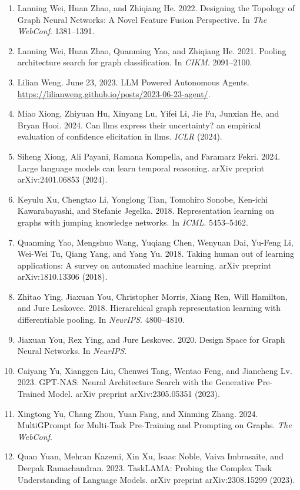 \documentclass[11pt,UTF8,fontset=fandol]{ctexart}
\begin{document}
\begin{enumerate}[leftmargin=2em,labelsep=0.5em]
\item Lanning Wei, Huan Zhao, and Zhiqiang He. 2022. Designing the Topology of Graph Neural Networks: A Novel Feature Fusion Perspective. In \textit{The WebConf}. 1381--1391.
\item Lanning Wei, Huan Zhao, Quanming Yao, and Zhiqiang He. 2021. Pooling architecture search for graph classification. In \textit{CIKM}. 2091--2100.
\item Lilian Weng. June 23, 2023. LLM Powered Autonomous Agents. \url{https://lilianweng.github.io/posts/2023-06-23-agent/}.
\item Miao Xiong, Zhiyuan Hu, Xinyang Lu, Yifei Li, Jie Fu, Junxian He, and Bryan Hooi. 2024. Can llms express their uncertainty? an empirical evaluation of confidence elicitation in llms. \textit{ICLR} (2024).
\item Siheng Xiong, Ali Payani, Ramana Kompella, and Faramarz Fekri. 2024. Large language models can learn temporal reasoning. arXiv preprint arXiv:2401.06853 (2024).
\item Keyulu Xu, Chengtao Li, Yonglong Tian, Tomohiro Sonobe, Ken-ichi Kawarabayashi, and Stefanie Jegelka. 2018. Representation learning on graphs with jumping knowledge networks. In \textit{ICML}. 5453--5462.
\item Quanming Yao, Mengshuo Wang, Yuqiang Chen, Wenyuan Dai, Yu-Feng Li, Wei-Wei Tu, Qiang Yang, and Yang Yu. 2018. Taking human out of learning applications: A survey on automated machine learning. arXiv preprint arXiv:1810.13306 (2018).
\item Zhitao Ying, Jiaxuan You, Christopher Morris, Xiang Ren, Will Hamilton, and Jure Leskovec. 2018. Hierarchical graph representation learning with differentiable pooling. In \textit{NeurIPS}. 4800--4810.
\item Jiaxuan You, Rex Ying, and Jure Leskovec. 2020. Design Space for Graph Neural Networks. In \textit{NeurIPS}.
\item Caiyang Yu, Xianggen Liu, Chenwei Tang, Wentao Feng, and Jiancheng Lv. 2023. GPT-NAS: Neural Architecture Search with the Generative Pre-Trained Model. arXiv preprint arXiv:2305.05351 (2023).
\item Xingtong Yu, Chang Zhou, Yuan Fang, and Xinming Zhang. 2024. MultiGPrompt for Multi-Task Pre-Training and Prompting on Graphs. \textit{The WebConf}.
\item Quan Yuan, Mehran Kazemi, Xin Xu, Isaac Noble, Vaiva Imbrasaite, and Deepak Ramachandran. 2023. TaskLAMA: Probing the Complex Task Understanding of Language Models. arXiv preprint arXiv:2308.15299 (2023).

\end{enumerate}
\end{document}

